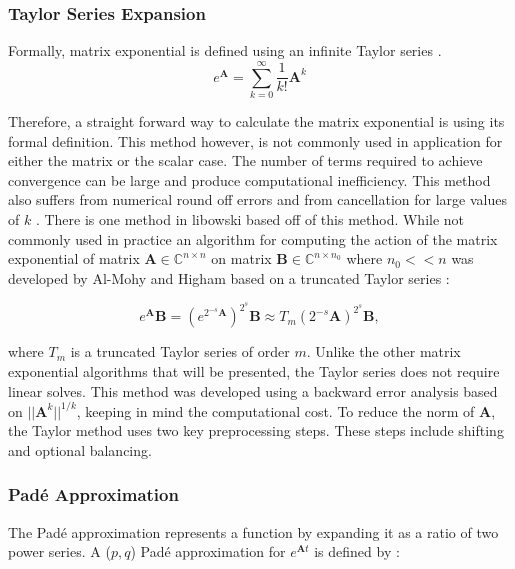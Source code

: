 \subsubsection{Taylor Series Expansion}
Formally,  matrix exponential is defined using an infinite Taylor series \cite{exokit} \cite{moler2003} \cite{pusa2010}. 
\begin{equation}
    e^{\boldsymbol{A}} = \sum_{k = 0}^{\infty}\frac{1}{k!}\boldsymbol{A}^{k}
    \label{eq:power_series_exp}
\end{equation}

\noindent Therefore, a straight forward way to calculate the matrix exponential is using its formal definition. This method however, is not commonly used in application for either the matrix or the scalar case. The number of terms required to achieve convergence can be large and produce computational inefficiency. This method also suffers from numerical round off errors and from cancellation for large values of $k$ \cite{moler2003}. There is one method in libowski based off of this method. While not commonly used in practice an algorithm for computing the action of the matrix exponential of matrix $\boldsymbol{A} \in \mathbb{C}^{n\times n}$ on matrix $\boldsymbol{B} \in \mathbb{C}^{n\times n_{0}}$ where $n_{0} << n$ was developed by Al-Mohy and Higham based on a truncated Taylor series \cite{higham2011}:

\begin{equation}
    e^{\boldsymbol{A}}\boldsymbol{B} = (e^{2^{-s}\boldsymbol{A}})^{2^{s}}\boldsymbol{B} \approx T_{m}(2^{-s}\boldsymbol{A})^{2^{s}}\boldsymbol{B},
\end{equation}

\noindent where $T_{m}$ is a truncated Taylor series of order $m$. Unlike the other matrix exponential algorithms that will be presented, the Taylor series does not require linear solves. This method was developed using a backward error analysis based on $||\boldsymbol{A}^{k}||^{1/k}$, keeping in mind the computational cost. To reduce the norm of $\boldsymbol{A}$, the Taylor method uses two key preprocessing steps. These steps include shifting and optional balancing. 


\subsubsection{Pad\'e Approximation}
The Pad\'e approximation represents a function by expanding it as a ratio of two power series. A ($p,q$) Pad\'e approximation for $e^{\boldsymbol{A}t}$ is defined by \cite{moler2003}:

